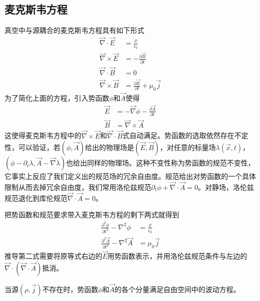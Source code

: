 \documentclass[a4paper,11pt]{ctexbook}
\newcommand{\bea}{\begin{equation}\begin{aligned}}
\newcommand{\eea}{\end{aligned}\end{equation}}
\newcommand{\del}{\vec{\nabla}}
\newcommand{\epv}{\epsilon_0}
\newcommand{\pfrac}[2]{\frac{\partial #1}{\partial #2}}
\begin{document}
\subsection{麦克斯韦方程}
真空中与源耦合的麦克斯韦方程具有如下形式
\bea \label{maxeq}
\del \cdot \vec{E} &= \frac{\rho}{\epv} \\
\del \times \vec{E} &= -\pfrac{\vec{B}}{t} \\
\del \cdot \vec{B} &= 0 \\ 
\del \times \vec{B} &= \pfrac{\vec{E}}{t}+ \mu_0 \vec{j}
\eea
为了简化上面的方程，引入势函数$\phi$和$\vec{A}$使得
\bea
\vec{E} &= -\del \phi - \pfrac{\vec{A}}{t} \\
\vec{B} & = \del \times \vec{A}
\eea
这使得麦克斯韦方程中的$\del \times \vec{E}$和$\del \cdot \vec{B}$式自动满足。势函数的选取依然存在不定性，可以验证，若$(\phi,\vec A)$给出的物理场是$( \vec E , \vec B )$，对任意的标量场$\lambda (\vec{x},t)$，$(\phi -\partial_t \lambda, \vec A - \del \lambda )$也给出同样的物理场。这种不变性称为势函数的规范不变性，它事实上反应了我们定义出的规范场的冗余自由度。规范给出对势函数的一个具体限制从而去掉冗余自由度，我们常用洛伦兹规范$\partial_t \phi + \del \cdot \vec A = 0$。对静场，洛伦兹规范退化到库伦规范$\del \cdot \vec A = 0$。
\par
把势函数和规范要求带入麦克斯韦方程的剩下两式就得到
\bea \label{maxpot}
\frac{\partial^2 \phi}{\partial t^2} - \nabla^2 \phi &= \frac{\rho }{\epv} \\
\frac{\partial^2 \vec A}{\partial t^2} - \nabla^2 \vec A &= \mu_0 \vec j 
\eea
推导第二式需要将原等式右边的$\vec E$用势函数表示，并用洛伦兹规范条件与左边的$\del \cdot ( \del \cdot \vec A)$抵消。
\par
当源$(\rho, \vec j )$不存在时，势函数$\phi$和$\vec A$的各个分量满足自由空间中的波动方程。
\end{document}
